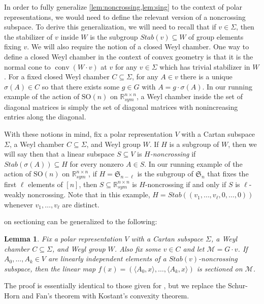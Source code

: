 \documentclass{article}
\numberwithin{equation}{section}
\newcommand{\R}{\mathbb{R}}
\newcommand{\SO}{\text{SO}}
\DeclareMathOperator*{\conv}{conv}
\newtheorem{lemma}{Lemma}[section]
\newcommand{\cM}{{\mathcal{M}}}
\begin{document}
In order to fully generalize  \cref{lem:noncrossing,lem:sing} to the context of polar representations, we would need to define the relevant version of a noncrossing subspace.
To derive this generalization, we will need to recall that if $v \in \Sigma$, then the stabilizer of $v$ inside $W$ is the subgroup $Stab(v) \subseteq W$ of group elements fixing $v$.
We will also require the notion of a closed Weyl chamber. One way to define a closed Weyl chamber in the context of convex geometry is that it is the normal cone to $\conv(W \cdot v)$ at $v$ for any $v \in \Sigma$ which has trivial stabilizer in $W$. For a fixed closed Weyl chamber $C \subseteq \Sigma$, for any $A \in v$ there is a unique $\sigma(A) \in C$ so that there exists some $g \in G$ with $A = g \cdot \sigma(A)$. In our running example of the action of $\SO(n)$ on $\R^{n\times n}_{sym}$, a Weyl chamber inside the set of diagonal matrices is simply the set of diagonal matrices with nonincreasing entries along the diagonal.

With these notions in mind, fix a polar representation $V$ with a Cartan subspace $\Sigma$, a Weyl chamber $C \subseteq \Sigma$, and Weyl group $W$. If $H$ is a subgroup of $W$, then we will say then that a linear subspace $S \subseteq V$ is \emph{$H$-noncrossing} if  $Stab(\sigma(A)) \subseteq H$ for every nonzero $A \in S$. In our running example of the action of $\SO(n)$ on $\R^{n\times n}_{sym}$, if $H = \mathfrak{S}_{n-\ell}$ is the subgroup of $\mathfrak{S}_n$ that fixes the first $\ell$ elements of $[n]$, then $S \subseteq \R^{n\times n}_{sym}$ is $H$-noncrossing if and only if $S$ is $\ell$-weakly noncrossing. Note that in this example, $H = Stab((v_1, \dots, v_{\ell}, 0, \dots, 0))$ whenever $v_1, \dots, v_{\ell}$ are distinct.

 on sectioning can be generalized to the following:

\begin{lemma}
\label{lem:noncrossing_gen}
Fix a polar representation $V$ with a Cartan subspace $\Sigma$, a Weyl chamber $C \subseteq \Sigma$, and Weyl group $W$. Also fix some $v \in C$ and let $\cM = G \cdot v$.
If $A_0, \dots, A_k \in V$ are linearly independent elements of a $Stab(v)$-noncrossing subspace, then the linear map $f(x) = (\langle A_0, x\rangle, \dots, \langle A_k, x\rangle)$ is sectioned on $\cM$.
\end{lemma}

The proof is essentially identical to those given for , but we replace the Schur-Horn and Fan's theorem with Kostant's convexity theorem.
\end{document}
